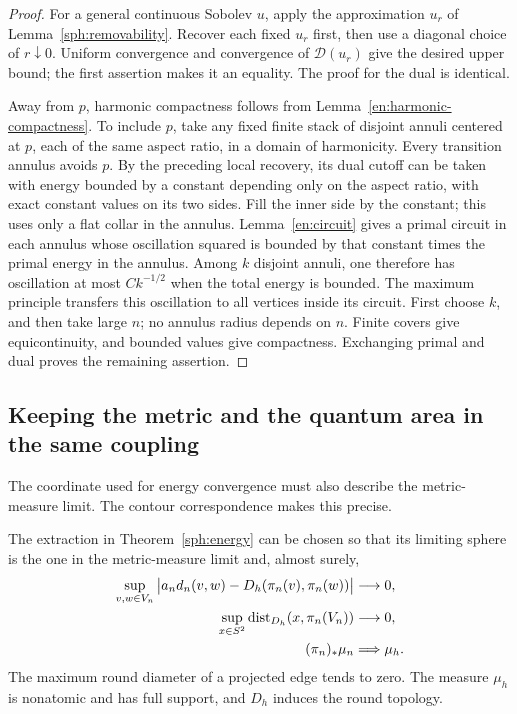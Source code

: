 \begin{proof}
For a general continuous Sobolev $u$, apply the approximation
$u_r$ of Lemma~\ref{sph:removability}.  Recover each fixed $u_r$ first,
then use a diagonal choice of $r\downarrow0$.  Uniform convergence and
convergence of $\mathcal D(u_r)$ give the desired upper bound; the
first assertion makes it an equality.  The proof for the dual is
identical.

Away from $p$, harmonic compactness follows from
Lemma~\ref{en:harmonic-compactness}.  To include $p$, take any fixed
finite stack of disjoint annuli centered at $p$, each of the same
aspect ratio, in a domain of harmonicity.  Every transition annulus
avoids $p$.  By the preceding local recovery, its dual cutoff can
be taken with energy bounded by a constant depending only on the
aspect ratio, with exact constant values on its two sides.  Fill
the inner side by the constant; this uses only a flat collar in the
annulus.  Lemma~\ref{en:circuit} gives a primal circuit in each annulus
whose oscillation squared is bounded by that constant times the
primal energy in the annulus.  Among $k$ disjoint annuli, one
therefore has oscillation at most $C k^{-1/2}$ when the total energy
is bounded.  The maximum principle transfers this oscillation to
all vertices inside its circuit.  First choose $k$, and then take
large $n$; no annulus radius depends on $n$.  Finite covers give
equicontinuity, and bounded values give compactness.  Exchanging
primal and dual proves the remaining assertion.
\end{proof}

\subsection{Keeping the metric and the quantum area in the same coupling}

The coordinate used for energy convergence must also describe the
metric-measure limit.  The contour correspondence makes this precise.

\begin{proposition}\label{sph:comparison}
The extraction in Theorem~\ref{sph:energy} can be chosen so that its
limiting sphere is the one in the metric-measure limit and, almost
surely,
\begin{align}
 \sup_{v,w\in V_n}
 \big|a_n d_n(v,w)-D_h(\pi_n(v),\pi_n(w))\big|&\longrightarrow0,
 \label{sph:distortion}\\
 \sup_{x\in S^2}\operatorname{dist}_{D_h}(x,\pi_n(V_n))&\longrightarrow0,
 \label{sph:dense}\\
 (\pi_n)_*\mu_n&\Longrightarrow\mu_h.
 \label{sph:measure}
\end{align}
The maximum round diameter of a projected edge tends to zero.
The measure $\mu_h$ is nonatomic and has full support, and $D_h$
induces the round topology.
\end{proposition}

